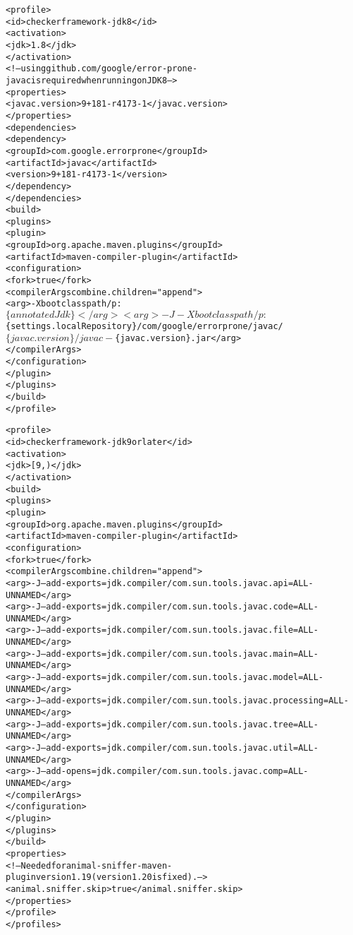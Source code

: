 \begin{enumerate}
\begin{mysmall}
\begin{alltt}
    <profile>
      <id>checkerframework-jdk8</id>
      <activation>
        <jdk>1.8</jdk>
      </activation>
      <!-- using github.com/google/error-prone-javac is required when running on JDK 8 -->
      <properties>
        <javac.version>9+181-r4173-1</javac.version>
      </properties>
      <dependencies>
        <dependency>
          <groupId>com.google.errorprone</groupId>
          <artifactId>javac</artifactId>
          <version>9+181-r4173-1</version>
        </dependency>
      </dependencies>
      <build>
        <plugins>
          <plugin>
            <groupId>org.apache.maven.plugins</groupId>
            <artifactId>maven-compiler-plugin</artifactId>
            <configuration>
              <fork>true</fork>
              <compilerArgs combine.children="append">
                <arg>-Xbootclasspath/p:$\{annotatedJdk\}</arg>
                <arg>-J-Xbootclasspath/p:$\{settings.localRepository\}/com/google/errorprone/javac/$\{javac.version\}/javac-$\{javac.version\}.jar</arg>
              </compilerArgs>
            </configuration>
          </plugin>
        </plugins>
      </build>
    </profile>

    <profile>
      <id>checkerframework-jdk9orlater</id>
      <activation>
        <jdk>[9,)</jdk>
      </activation>
      <build>
        <plugins>
          <plugin>
            <groupId>org.apache.maven.plugins</groupId>
            <artifactId>maven-compiler-plugin</artifactId>
            <configuration>
              <fork>true</fork>
              <compilerArgs combine.children="append">
                <arg>-J--add-exports=jdk.compiler/com.sun.tools.javac.api=ALL-UNNAMED</arg>
                <arg>-J--add-exports=jdk.compiler/com.sun.tools.javac.code=ALL-UNNAMED</arg>
                <arg>-J--add-exports=jdk.compiler/com.sun.tools.javac.file=ALL-UNNAMED</arg>
                <arg>-J--add-exports=jdk.compiler/com.sun.tools.javac.main=ALL-UNNAMED</arg>
                <arg>-J--add-exports=jdk.compiler/com.sun.tools.javac.model=ALL-UNNAMED</arg>
                <arg>-J--add-exports=jdk.compiler/com.sun.tools.javac.processing=ALL-UNNAMED</arg>
                <arg>-J--add-exports=jdk.compiler/com.sun.tools.javac.tree=ALL-UNNAMED</arg>
                <arg>-J--add-exports=jdk.compiler/com.sun.tools.javac.util=ALL-UNNAMED</arg>
                <arg>-J--add-opens=jdk.compiler/com.sun.tools.javac.comp=ALL-UNNAMED</arg>
              </compilerArgs>
            </configuration>
          </plugin>
        </plugins>
      </build>
      <properties>
        <!-- Needed for animal-sniffer-maven-plugin version 1.19 (version 1.20 is fixed). -->
        <animal.sniffer.skip>true</animal.sniffer.skip>
      </properties>
    </profile>
  </profiles>
\end{alltt}
\end{mysmall}


\end{enumerate}
